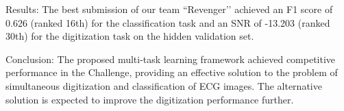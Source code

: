 \documentclass{cinc-abstract}
\newcommand\wordcount{ \currfilepath"}}
\begin{document}
Results: The best submission of our team ``Revenger’’ achieved an F1 score of 0.626 (ranked 16th) for the classification task and an SNR of -13.203 (ranked 30th) for the digitization task on the hidden validation set.

Conclusion: The proposed multi-task learning framework achieved competitive performance in the Challenge, providing an effective solution to the problem of simultaneous digitization and classification of ECG images. The alternative solution is expected to improve the digitization performance further.


\end{document}
